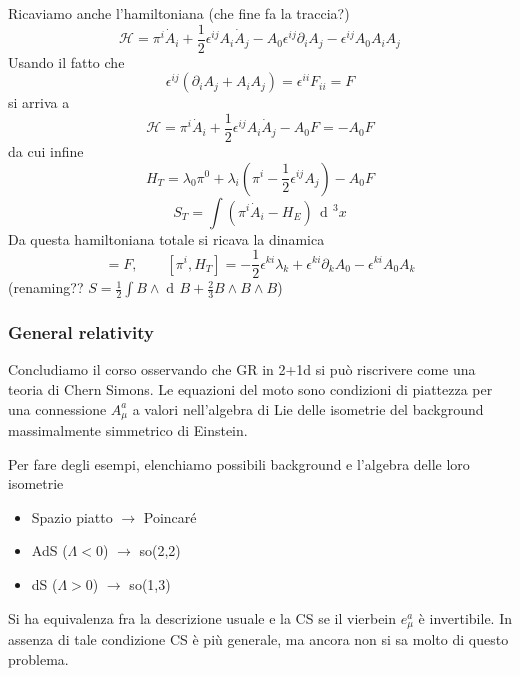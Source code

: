 \documentclass[a4paper, 11pt]{article}
\newcommand{\dd}{\mathop{\mathrm{d}\!}{}}
\begin{document}
	Ricaviamo anche l'hamiltoniana (che fine fa la traccia?)
	\begin{equation*}
	\mathcal{H} = \pi^i \dot{A}_i + \frac{1}{2} \epsilon^{ij} A_i \dot{A}_j - A_0 \epsilon^{ij} \partial_i A_j - \epsilon^{ij} A_0 A_i A_j
	\end{equation*}
	Usando il fatto che
	\begin{equation*}
	\epsilon^{ij} (\partial_i A_j + A_i A_j) = \epsilon^{ii} F_{ii} = F
	\end{equation*}
	si arriva a
	\begin{equation*}
	\mathcal{H} = \pi^i \dot{A}_i + \frac{1}{2} \epsilon^{ij} A_i \dot{A}_j - A_0 F = -A_0 F
	\end{equation*}
	da cui infine
	\begin{equation*}
	H_T = \lambda_0 \pi^0 + \lambda_i (\pi^i -\frac{1}{2} \epsilon^{ij} A_j) - A_0 F
	\end{equation*}
	\begin{equation*}
	S_T = \int (\pi^i \dot{A}_i - H_E)\,\dd^3 x
	\end{equation*}
	Da questa hamiltoniana totale si ricava la dinamica
	\begin{equation*}
	[\pi^0, H_T] = F,\qquad [\pi^i, H_T] = -\frac{1}{2} \epsilon^{ki} \lambda_k + \epsilon^{ki} \partial_k A_0 - \epsilon^{ki} A_0 A_k
	\end{equation*}
	(renaming?? $S = \frac{1}{2} \int B\wedge\dd B + \frac{2}{3} B\wedge B\wedge B$)
	
	\subsubsection{General relativity}
	Concludiamo il corso osservando che GR in 2+1d si può riscrivere come una teoria di Chern Simons. Le equazioni del moto sono condizioni di piattezza per una connessione $A_\mu^a$ a valori nell'algebra di Lie delle isometrie del background massimalmente simmetrico di Einstein.

	Per fare degli esempi, elenchiamo possibili background e l'algebra delle loro isometrie
	\begin{itemize}
		\item Spazio piatto $\rightarrow$ Poincaré
		\item AdS ($\Lambda<0$) $\rightarrow$ so(2,2)
		\item dS ($\Lambda>0$) $\rightarrow$ so(1,3)
	\end{itemize}
	
	Si ha equivalenza fra la descrizione usuale e la CS se il vierbein $e_\mu^a$ è invertibile. In assenza di tale condizione CS è più generale, ma ancora non si sa molto di questo problema.
	
\end{document}
